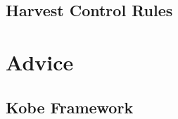 \documentclass[shortnames,nojss,article]{jss}
\newenvironment{mylisting}
{\begin{list}{}{\setlength{\leftmargin}{1em}}\item\scriptsize\bfseries}
{\end{list}}
\begin{document}
\subsection{Harvest Control Rules}

\begin{mylisting}\begin{center}\begin{minipage}[H]{0.95\textwidth}\begin{shaded} 
\end{shaded}\end{minipage}\end{center}\end{mylisting}

\section{Advice}

\subsection{Kobe Framework}

\begin{mylisting}\begin{center}\begin{minipage}[H]{0.95\textwidth}\begin{shaded} 
\end{shaded}\end{minipage}\end{center}\end{mylisting}
\end{document}
